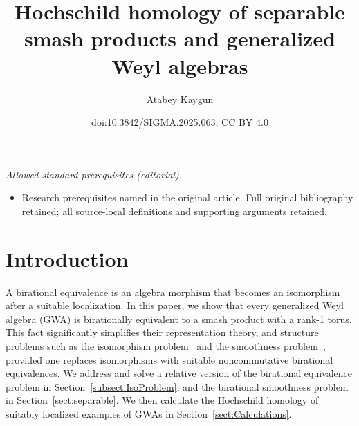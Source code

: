\documentclass[10pt,a4paper]{amsart}
\title{Hochschild homology of separable smash products and generalized Weyl algebras}
\author{Atabey Kaygun}
\date{doi:10.3842/SIGMA.2025.063; CC BY 4.0}
\numberwithin{equation}{section}
\begin{document}
\maketitle
\noindent\textit{Allowed standard prerequisites (editorial).}\begin{itemize}
\item Research prerequisites named in the original article. Full original bibliography retained; all source-local definitions and supporting arguments retained.
\end{itemize}\medskip
\section{Introduction}

A birational equivalence is an algebra morphism that becomes an isomorphism after a suitable
localization. In this paper, we show that every generalized Weyl algebra (GWA) is birationally
equivalent to a smash product with a rank-1 torus. This fact significantly simplifies their
representation theory, and structure problems such as the isomorphism
problem~\cite{BavulaJordan:IsoProblem,Hodges:NCDeformations, RichardSolotar:IsoProblem,
 AlvarezVivaz:IsomorphismsOfQGWAs, Tang:IsoProblem} and the smoothness
problem~\cite{Bavula:GlobalDim, Hodges:NCDeformations,
 Liu:HomologicalSmoothnessI,Liu:HomologicalSmoothnessII, SolotarAlvarezVivas:QuantumGeneralizedWeyl}, provided one replaces isomorphisms with
suitable noncommutative birational equivalences. We address and solve a relative version of the
birational equivalence problem in Section~\ref{subsect:IsoProblem}, and the birational smoothness
problem in Section~\ref{sect:separable}. We then calculate the Hochschild homology of suitably
localized examples of GWAs in Section~\ref{sect:Calculations}.
\end{document}
